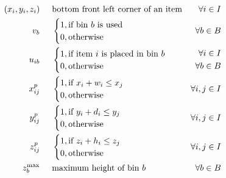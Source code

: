 \begin{align}
              (x_i,y_i,z_i) \hspace{.5cm}& \text{bottom front left corner of an item} & \forall i \in I \label{var:item_pos} \\
                    v_{b} \hspace{.5cm}& \begin{cases}
                                            1, \text{if bin $b$ is used} \\ 
                                            0, \text{otherwise}
                                        \end{cases} & \forall b \in B \notag \\
                    u_{ib} \hspace{.5cm}& \begin{cases}
                                            1, \text{if item $i$ is placed in bin $b$} \\ 
                                            0, \text{otherwise}
                                        \end{cases} & \begin{aligned} \forall i \in I \\ 
                                                                \forall b \in B 
                                                        \end{aligned} \notag \\
                    x^p_{ij} \hspace{.5cm}& \begin{cases}
                                            1, \text{if $x_i + w_i \le x_j$} \\ 
                                            0, \text{otherwise}
                                        \end{cases} & \forall i,j \in I \notag \\
                    y^p_{ij} \hspace{.5cm}& \begin{cases}
                                            1, \text{if $y_i + d_i \le y_j$} \\ 
                                            0, \text{otherwise}
                                        \end{cases} & \forall i,j \in I \notag \\
                    z^p_{ij} \hspace{.5cm}& \begin{cases}
                                            1, \text{if $z_i + h_i \le z_j$} \\ 
                                            0, \text{otherwise}
                                        \end{cases} & \forall i,j \in I \notag \\
            z_b^\text{max} \hspace{.5cm}& \text{maximum height of bin $b$} & \forall b \in B \notag
\end{align}

